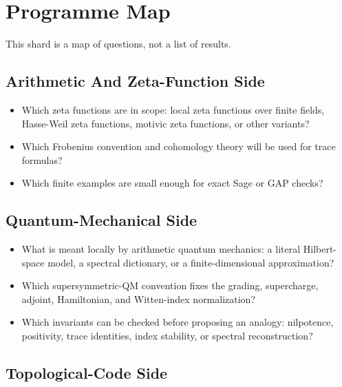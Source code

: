 
\section{Programme Map}

This shard is a map of questions, not a list of results.

\subsection{Arithmetic And Zeta-Function Side}

\begin{itemize}
  \item Which zeta functions are in scope: local zeta functions over finite
  fields, Hasse-Weil zeta functions, motivic zeta functions, or other
  variants?
  \item Which Frobenius convention and cohomology theory will be used for trace
  formulas?
  \item Which finite examples are small enough for exact Sage or GAP checks?
\end{itemize}

\subsection{Quantum-Mechanical Side}

\begin{itemize}
  \item What is meant locally by arithmetic quantum mechanics: a literal
  Hilbert-space model, a spectral dictionary, or a finite-dimensional
  approximation?
  \item Which supersymmetric-QM convention fixes the grading, supercharge,
  adjoint, Hamiltonian, and Witten-index normalization?
  \item Which invariants can be checked before proposing an analogy:
  nilpotence, positivity, trace identities, index stability, or spectral
  reconstruction?
\end{itemize}

\subsection{Topological-Code Side}

